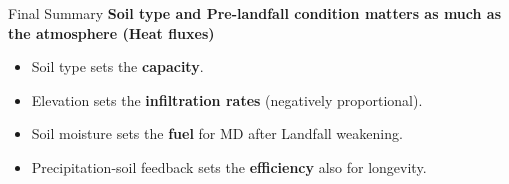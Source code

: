 \begin{frame}{Final Summary}
	\vspace{0.3cm}
	\textbf{Soil type and Pre-landfall condition matters as much as the atmosphere (Heat fluxes)}

	\vspace{0.3cm}
	\footnotesize
	\begin{itemize}
		\item Soil type sets the \textbf{capacity}.
		\item Elevation sets the \textbf{infiltration rates} (negatively proportional).
		\item Soil moisture sets the \textbf{fuel} for MD after Landfall weakening.
		\item Precipitation-soil feedback sets the \textbf{efficiency} also for longevity.
	\end{itemize}
\end{frame}
